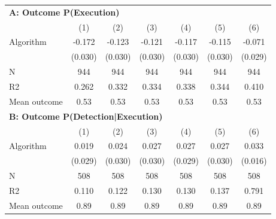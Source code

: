 \begin{tabular}{lcccccc} \toprule
\multicolumn{7}{l}{\textbf{A: Outcome P(Execution)}} \\ \multicolumn{1}{l}{} & (1) & (2) & (3) & (4) & (5) & (6) \\ \midrule
Algorithm   &      -0.172\sym{***}&      -0.123\sym{***}&      -0.121\sym{***}&      -0.117\sym{***}&      -0.115\sym{***}&      -0.071\sym{**} \\
            &     (0.030)         &     (0.030)         &     (0.030)         &     (0.030)         &     (0.030)         &     (0.029)         \\
\midrule
N           &         944         &         944         &         944         &         944         &         944         &         944         \\
R2          &       0.262         &       0.332         &       0.334         &       0.338         &       0.344         &       0.410         \\
Mean outcome&        0.53         &        0.53         &        0.53         &        0.53         &        0.53         &        0.53         \\

\midrule \multicolumn{7}{l}{\textbf{B: Outcome P(Detection|Execution)}} \\ \multicolumn{1}{l}{} & (1) & (2) & (3) & (4) & (5) & (6) \\ \midrule
Algorithm   &       0.019         &       0.024         &       0.027         &       0.027         &       0.027         &       0.033\sym{**} \\
            &     (0.029)         &     (0.030)         &     (0.030)         &     (0.029)         &     (0.030)         &     (0.016)         \\
\midrule
N           &         508         &         508         &         508         &         508         &         508         &         508         \\
R2          &       0.110         &       0.122         &       0.130         &       0.130         &       0.137         &       0.791         \\
Mean outcome&        0.89         &        0.89         &        0.89         &        0.89         &        0.89         &        0.89         \\


\end{tabular}
